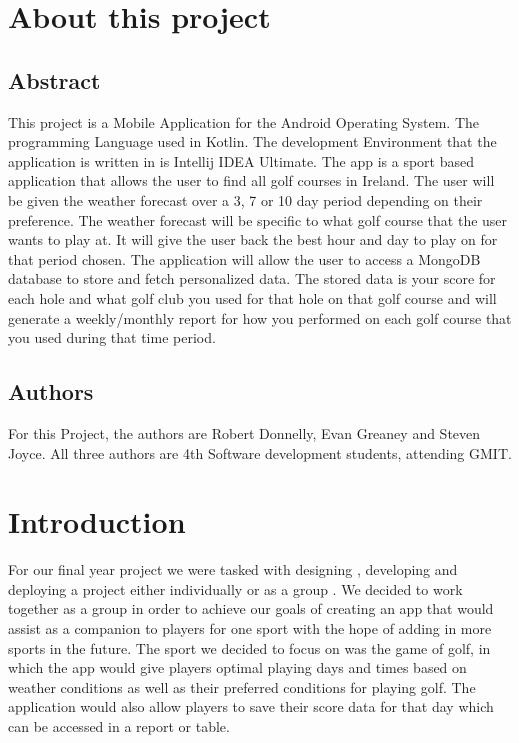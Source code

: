 \chapter{About this project}
\section{Abstract}
This project is a Mobile Application for the Android Operating System. The programming Language used in Kotlin. The development Environment that the application is written in is Intellij IDEA Ultimate. \newline
The app is a sport based application that allows the user to find all golf courses in Ireland. The user will be given the weather forecast over a 3, 7 or 10 day period depending on their preference. The weather forecast will be specific to what golf course that the user wants to play at. It will give the user back the best hour and day to play on for that period chosen. \newline
The application will allow the user to access a MongoDB database to store and fetch personalized data. The stored data is your score for each hole and what golf club you used for that hole on that golf course and will generate a weekly/monthly report for how you performed on each golf course that you used during that time period.\newline
\section{Authors}
For this Project, the authors are Robert Donnelly, Evan Greaney and Steven Joyce. All three authors are 4th Software development students, attending GMIT.
\chapter{Introduction}

For our final year project we were tasked with designing , developing and deploying a project either individually or as a group . We decided to work together as a group in order to achieve our goals of creating an app that would assist as a companion to players for one sport with the hope of adding in more sports in the future. The sport we decided to focus on was the game of golf, in which the app would give players optimal playing days and times based on weather conditions as well as their preferred conditions for playing golf. The application would also allow players to save their score data for that day which can be accessed in a report or table.


